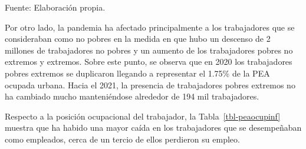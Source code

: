 \documentclass[
  letterpaper,
  12pt,
  oneside,
  spanish,
  doublespacing,
  headsepline,
  parskip]{MastersDoctoralThesis}
\begin{document}
\noindent \small Fuente: Elaboración propia. \normalsize

Por otro lado, la pandemia ha afectado principalmente a los trabajadores
que se consideraban como no pobres en la medida en que hubo un descenso
de 2 millones de trabajadores no pobres y un aumento de los trabajadores
pobres no extremos y extremos. Sobre este punto, se observa que en 2020
los trabajadores pobres extremos se duplicaron llegando a representar el
1.75\% de la PEA ocupada urbana. Hacia el 2021, la presencia de
trabajadores pobres extremos no ha cambiado mucho manteniéndose
alrededor de 194 mil trabajadores.

Respecto a la posición ocupacional del trabajador, la
Tabla~\ref{tbl-peaocupinf} muestra que ha habido una mayor caída en los
trabajadores que se desempeñaban como empleados, cerca de un tercio de
ellos perdieron su empleo.
\end{document}
